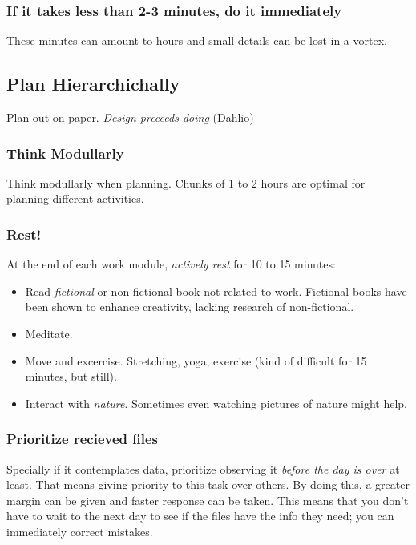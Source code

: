\documentclass{book}
\begin{document}
\subsubsection{If it takes less than 2-3 minutes, do it immediately}
These minutes can amount to hours and small details can be lost in a vortex.
\subsection{Plan Hierarchichally}
Plan out on paper. \emph{Design preceeds doing} (Dahlio)
\subsubsection{Think Modullarly}
Think modullarly when planning. Chunks of 1 to 2 hours are {\color{orange} optimal} for planning different activities.

\subsubsection{Rest!}

At the end of each work module, \emph{actively rest} for 10 to 15 minutes:
\begin{itemize}
\item Read \emph{fictional} or {\color{orange}non-fictional} book not related to work. Fictional books have been shown to enhance creativity, {\color{red} lacking research of non-fictional}.
\item Meditate.
\item Move and excercise. Stretching, yoga, exercise (kind of difficult for 15 minutes, but still).
\item Interact with \emph{nature}. Sometimes even watching pictures of nature might help.



\end{itemize}

\subsubsection{Prioritize recieved files}
Specially if it contemplates data, prioritize observing it \emph{before the day is over} at least. That means giving priority to this task over others. By doing this, a greater margin can be given and faster response can be taken. This means that you don't have to wait to the next day to see if the files have the info they need; you can immediately correct mistakes.
\end{document}
